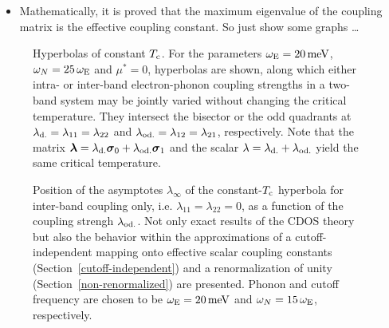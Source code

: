 \begin{itemize}
    \item Mathematically, it is proved that the maximum eigenvalue of the
          coupling matrix is the effective coupling constant. So just show some
          graphs \dots
\end{itemize}

\begin{figure}
    \small
    
    
    
    
    
    
    \caption[Hyperbolas of constant $T \sub c$]{
        Hyperbolas of constant $T \sub c$. For the parameters $\omega \sb{\text{E}} = 20
        \, \mathrm{meV}$, $\omega_N = 25 \, \omega \sb{\text{E}}$ and $\mu^* = 0$,
        hyperbolas are shown, along which either intra- or inter-band
        electron-phonon coupling strengths in a two-band system may be jointly
        varied without changing the critical temperature. They intersect the
        bisector or the odd quadrants at $\lambda \sb{\text{d.}} = \lambda_{1 1} =
        \lambda_{2 2}$ and $\lambda \sb{\text{od.}} = \lambda_{1 2} = \lambda_{2 1}$,
        respectively. Note that the matrix $\boldsymbol \lambda = \lambda \sb{\text{d.}} \boldsymbol
        \sigma_0 + \lambda \sb{\text{od.}} \boldsymbol \sigma_1$ and the scalar $\lambda =
        \lambda \sb{\text{d.}} + \lambda \sb{\text{od.}}$ yield the same critical
        temperature.}
\end{figure}

\begin{figure}
    \small
    
    
    \caption[Asymptotes of inter-band hyperbola of constant $T \sub c$]{
        Position of the asymptotes $\lambda_\infty$ of the constant-$T \sub c$
        hyperbola for inter-band coupling only, i.e. $\lambda_{1 1} = \lambda_{2
        2} = 0$, as a function of the coupling strengh $\lambda \sb{\text{od.}}$. Not
        only exact results of the CDOS  theory but also the
        behavior within the approximations of a cutoff-independent mapping onto
        effective scalar coupling constants (Section~\ref{cutoff-independent})
        and a renormalization of unity (Section~\ref{non-renormalized}) are
        presented. Phonon and cutoff frequency are chosen to be $\omega \sb{\text{E}} =
        20 \, \mathrm{meV}$ and $\omega_N = 15 \, \omega \sb{\text{E}}$, respectively.}
\end{figure}

